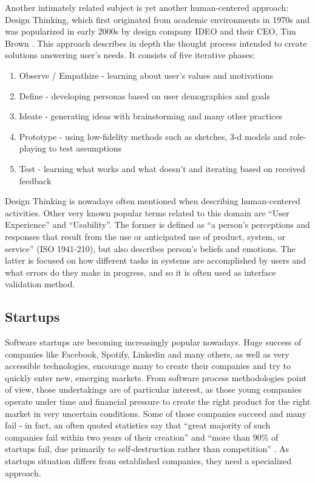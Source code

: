 \documentclass{article}
\begin{document}
Another intimately related subject is yet another human-centered approach: Design Thinking, which first originated from academic environments in 1970s and was popularized in early 2000s by design company IDEO and their CEO, Tim Brown \cite{brown2009change}. This approach describes in depth the thought process intended to create solutions answering user's needs. It consists of five iterative phases:
\begin{enumerate}
    \item Observe / Empathize - learning about user's values and motivations
    \item Define - developing personas based on user demographics and goals
    \item Ideate - generating ideas with brainstorming and many other practices
    \item Prototype - using low-fidelity methods such as sketches, 3-d models and role-playing to test assumptions
    \item Test - learning what works and what doesn't and iterating based on received feedback
\end{enumerate}
Design Thinking is nowadays often mentioned when describing human-centered activities. Other very known popular terms related to this domain are ``User Experience'' and ``Usability''. The former is defined as ``a person's perceptions and responses that result from the use or anticipated use of product, system, or service'' (ISO 1941-210), but also describes person's beliefs and emotions. The latter is focused on how different tasks in systems are accomplished by users and what errors do they make in progress, and so it is often used as interface validation method. 

\subsection{Startups}
Software startups are becoming increasingly popular nowadays. Huge success of companies like Facebook, Spotify, Linkedin and many others, as well as very accessible technologies, encourage many to create their companies and try to quickly enter new, emerging markets. From software process methodologies point of view, those undertakings are of particular interest, as those young companies operate under time and financial pressure to create the right product for the right market in very uncertain conditions. Some of those companies succeed and many fail - in fact, an often quoted statistics say that ``great majority of such companies fail within two years of their creation'' \cite{paternoster2014software} and ``more than 90\% of startups fail, due primarily to self-destruction rather than competition'' \cite{giardino2014early}. As startups situation differs from established companies, they need a specialized approach. 
\end{document}
